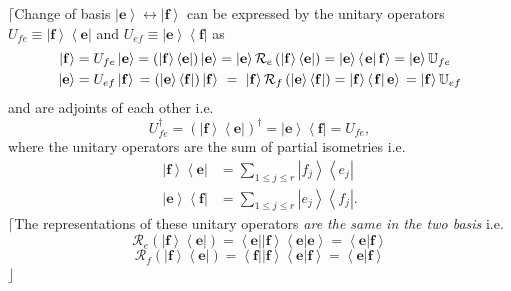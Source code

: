 \documentclass[aps,preprint]{revtex4}
\begin{document}
$\lceil $Change of basis $\left\vert \mathbf{e}\right\rangle \leftrightarrow
\left\vert \mathbf{f}\right\rangle $ can be expressed by the unitary
operators $U_{fe}\equiv \left\vert \mathbf{f}\right\rangle \left\langle 
\mathbf{e}\right\vert $ and $U_{ef}\equiv \left\vert \mathbf{e}\right\rangle
\left\langle \mathbf{f}\right\vert $ as 
\begin{align}
\left\vert \mathbf{f}\right\rangle & =U_{fe}\left\vert \mathbf{e}%
\right\rangle =\left( \left\vert \mathbf{f}\right\rangle \left\langle 
\mathbf{e}\right\vert \right) \left\vert \mathbf{e}\right\rangle =\left\vert 
\mathbf{e}\right\rangle \mathcal{R}_{e}\left( \left\vert \mathbf{f}%
\right\rangle \left\langle \mathbf{e}\right\vert \right) =\left\vert \mathbf{%
e}\right\rangle \left\langle \left. \mathbf{e}\right\vert \mathbf{f}%
\right\rangle =\left\vert \mathbf{e}\right\rangle \mathbb{U}_{fe} \\
\left\vert \mathbf{e}\right\rangle & =U_{ef}\left\vert \mathbf{f}%
\right\rangle \,=\left( \left\vert \mathbf{e}\right\rangle \left\langle 
\mathbf{f}\right\vert \right) \left\vert \mathbf{f}\right\rangle
\,\,=\,\,\left\vert \mathbf{f}\right\rangle \mathcal{R}_{f}\left( \left\vert 
\mathbf{e}\right\rangle \left\langle \mathbf{f}\right\vert \right)
=\left\vert \mathbf{f}\right\rangle \left\langle \left. \mathbf{f}%
\right\vert \mathbf{e}\right\rangle \,=\left\vert \mathbf{f}\right\rangle 
\mathbb{U}_{ef}
\end{align}%
and are adjoints of each other i.e. 
\begin{equation}
U_{fe}^{\dagger }=\left( \left\vert \mathbf{f}\right\rangle \left\langle 
\mathbf{e}\right\vert \right) ^{\dagger }=\left\vert \mathbf{e}\right\rangle
\left\langle \mathbf{f}\right\vert =U_{fe},
\end{equation}%
where the unitary operators are the sum of partial isometries i.e. 
\begin{align}
\left\vert \mathbf{f}\right\rangle \left\langle \mathbf{e}\right\vert &
=\sum_{1\leq j\leq r}\left\vert f_{j}\right\rangle \left\langle
e_{j}\right\vert \\
\left\vert \mathbf{e}\right\rangle \left\langle \mathbf{f}\right\vert &
=\sum_{1\leq j\leq r}\left\vert e_{j}\right\rangle \left\langle
f_{j}\right\vert .
\end{align}%
$\lceil $The representations of these unitary operators \emph{are the same
in the two basis} i.e. 
\begin{equation}
\mathcal{R}_{e}\left( \left\vert \mathbf{f}\right\rangle \left\langle 
\mathbf{e}\right\vert \right) =\left\langle \left. \mathbf{e}\right\vert
\left\vert \mathbf{f}\right\rangle \left\langle \mathbf{e}\right\vert 
\mathbf{e}\right\rangle =\left\langle \left. \mathbf{e}\right\vert \mathbf{f}%
\right\rangle
\end{equation}%
\begin{equation}
\mathcal{R}_{f}\left( \left\vert \mathbf{f}\right\rangle \left\langle 
\mathbf{e}\right\vert \right) =\left\langle \left. \mathbf{f}\right\vert
\left\vert \mathbf{f}\right\rangle \left\langle \mathbf{e}\right\vert 
\mathbf{f}\right\rangle =\left\langle \left. \mathbf{e}\right\vert \mathbf{f}%
\right\rangle
\end{equation}%
$\rfloor $
\end{document}

